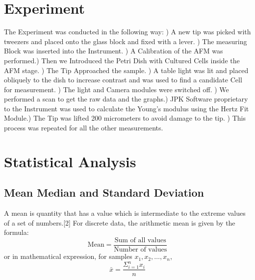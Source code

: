\documentclass[a4paper,english,12pt,bibliography=totoc]{scrreprt}
\begin{document}
\section{Experiment}
\label{sec:experiment} 
The Experiment was conducted in the following way: ) A new tip was picked with tweezers and placed onto the glass block and fixed with a lever. ) The measuring Block was inserted into the Instrument. ) A Calibration of the AFM was performed.) Then we  Introduced the Petri Dish with Cultured Cells inside the AFM stage. ) The Tip Approached the sample. ) A table light was lit and placed obliquely to the dish to increase contrast and was used to find a candidate Cell for measurement. ) The light and Camera modules were switched off. ) We performed a  scan to get the raw data and the graphs.) JPK Software proprietary to the Instrument was used to calculate the Young's modulus using the Hertz Fit Module.) The Tip was lifted  200 micrometers to avoid damage to the tip. ) This process was repeated for all the other measurements.

\section{Statistical Analysis}
\label{sec:statanalysis} 



\subsection{Mean Median and Standard Deviation}
\label{subsec:mmandsd}
A mean is quantity that has a value which is intermediate to the extreme values of a set of numbers.[2] For discrete data, the arithmetic mean is given by the formula:
\[ \text{Mean} = \frac{\text{Sum of all values}}{\text{Number of values}}\]
or in mathematical expression, for samples \(x_1, x_2, \ldots, x_n\),
\[\bar{x} = \frac{\Sigma^n_{i=1} x_i}{n}\]
\end{document}

